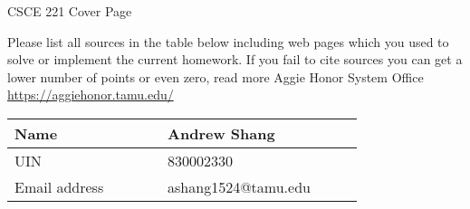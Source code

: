 \documentclass[english]{article}
\begin{document}

\begin{centering}
    {\Large CSCE 221 Cover Page} \\ \medskip    
\end{centering}

Please list all sources in the table below including web pages which you used to solve or implement the current homework. If you fail to cite sources you can get a lower number of points or even zero, read more Aggie Honor System Office \url{https://aggiehonor.tamu.edu/} \\

\noindent
\begin{center}
    {\large
    \begin{tabular}{|p{0.35\linewidth}|p{0.45\linewidth}|} \hline
        Name          & Andrew Shang       \\ \hline
        UIN           & 830002330         \\ \hline
        Email address & ashang1524@tamu.edu      \\ \hline
    \end{tabular}
    }
\end{center}
\end{document}
